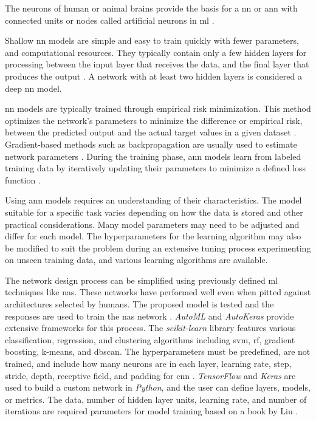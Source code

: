 \documentclass[sn-mathphys-num]{sn-jnl}%
\begin{document}
The neurons of human or animal brains provide the basis for a \acrfull{nn} or \acrfull{ann} with connected units or nodes called artificial neurons in \acrlong{ml} \cite{mitExplainedNeural, brahme2014comprehensive}. 

Shallow \acrshort{nn} models are simple and easy to train quickly with fewer parameters, and computational resources. They typically contain only a few hidden layers for processing between the input layer that receives the data, and the final layer that produces the output \cite{olden2002illuminating, ozesmi1999artificial}.  A network with at least two hidden layers \cite{bishop2006pattern} is considered a deep \acrshort{nn} model.

\acrshort{nn} models are typically trained through empirical risk minimization. This method optimizes the network's parameters to minimize the difference or empirical risk, between the predicted output and the actual target values in a given dataset \cite{vapnik2013nature}. Gradient-based methods such as backpropagation are usually used to estimate network parameters  \cite{vapnik2013nature}. During the training phase, \acrshort{ann} models learn from labeled training data by iteratively updating their parameters to minimize a defined loss function \cite{goodfellow2016deep}.

Using \acrshort{ann} models requires an understanding of their characteristics. The model suitable for a specific task varies depending on how the data is stored and other practical considerations. Many model parameters may need to be adjusted and differ for each model. The hyperparameters for the learning algorithm may also be modified to suit the problem \cite{probst2019tunability} during an extensive tuning process experimenting on unseen training data, and various learning algorithms are available.

The network design process can be simplified using previously defined \acrshort{ml} techniques like \acrfull{nas}. These networks have performed well even when pitted against architectures selected by humans. The proposed model is tested and the responses are used to train the \acrshort{nas} network \cite{zoph2016neural}. \textit{AutoML} and \textit{AutoKeras} \cite{jin2019auto} provide extensive frameworks for this process. The \textit{scikit-learn} library features various classification, regression, and clustering algorithms including \acrshort{svm}, \acrfull{rf}, gradient boosting, k-means, and \acrfull{dbscan}. The hyperparameters must be predefined, are not trained, and include how many neurons are in each layer, learning rate, step, stride, depth, receptive field, and padding for \acrfull{cnn} \cite{claesen2015hyperparameter}. \textit{TensorFlow} and \textit{Keras} are used to build a custom network in \textit{Python}, and the user can define layers, models, or metrics. The data, number of hidden layer units, learning rate, and number of iterations are required parameters for model training based on a book by Liu \cite{liu2020python}.
\end{document}
